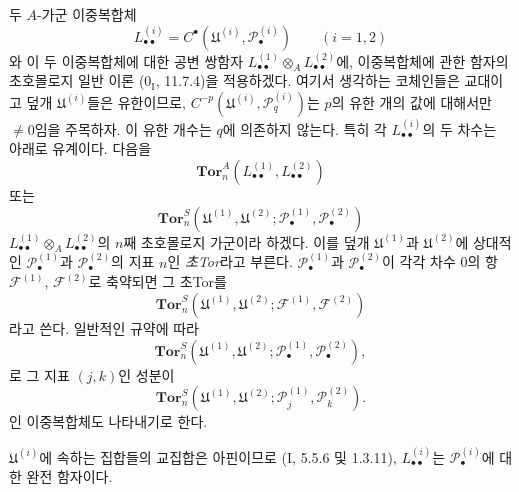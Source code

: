 \begin{env}[6.6.2]
\label{III.6.6.2-fr}
두 $A$-가군 이중복합체
\[
  L_{\bullet\bullet}^{(i)}
  =C^\bullet(\mathfrak U^{(i)},\mathscr P_\bullet^{(i)})
  \qquad(i=1,2)
\]
와 이 두 이중복합체에 대한 공변 쌍함자
$L_{\bullet\bullet}^{(1)}\otimes_A L_{\bullet\bullet}^{(2)}$에,
이중복합체에 관한 함자의 초호몰로지 일반 이론
($0_{\mathrm I}$, 11.7.4)을 적용하겠다. 여기서 생각하는 코체인들은
교대이고 덮개 $\mathfrak U^{(i)}$들은 유한이므로,
$C^{-p}(\mathfrak U^{(i)},\mathscr P_q^{(i)})$는 $p$의 유한 개의
값에 대해서만 $\ne0$임을 주목하자. 이 유한 개수는 $q$에 의존하지
않는다. 특히 각 $L_{\bullet\bullet}^{(i)}$의 두 차수는 아래로
유계이다. 다음을
\[
  \mathbf{Tor}_n^A(L_{\bullet\bullet}^{(1)},L_{\bullet\bullet}^{(2)})
\]
또는
\[
  \mathbf{Tor}_n^S
  (\mathfrak U^{(1)},\mathfrak U^{(2)};
   \mathscr P_\bullet^{(1)},\mathscr P_\bullet^{(2)})
\]
$L_{\bullet\bullet}^{(1)}\otimes_A L_{\bullet\bullet}^{(2)}$의 $n$째
초호몰로지 가군이라 하겠다. 이를 덮개 $\mathfrak U^{(1)}$과
$\mathfrak U^{(2)}$에 상대적인 $\mathscr P_\bullet^{(1)}$과
$\mathscr P_\bullet^{(2)}$의 지표 $n$인 \emph{초Tor}라고 부른다.
$\mathscr P_\bullet^{(1)}$과 $\mathscr P_\bullet^{(2)}$이 각각 차수
0의 항 $\mathscr F^{(1)}$, $\mathscr F^{(2)}$로 축약되면 그
초Tor를
\[
  \mathbf{Tor}_n^S
  (\mathfrak U^{(1)},\mathfrak U^{(2)};
   \mathscr F^{(1)},\mathscr F^{(2)})
\]
라고 쓴다. 일반적인 규약에 따라
\[
  \mathbf{Tor}_n^S
  (\mathfrak U^{(1)},\mathfrak U^{(2)};
   \mathscr P_\bullet^{(1)},\mathscr P_\bullet^{(2)}),
\]
로 그 지표 $(j,k)$인 성분이
\[
  \mathbf{Tor}_n^S
  (\mathfrak U^{(1)},\mathfrak U^{(2)};
   \mathscr P_j^{(1)},\mathscr P_k^{(2)}).
\]
인 이중복합체도 나타내기로 한다.

$\mathfrak U^{(i)}$에 속하는 집합들의 교집합은 아핀이므로
(I, 5.5.6 및 1.3.11), $L_{\bullet\bullet}^{(i)}$는
$\mathscr P_\bullet^{(i)}$에 대한 완전 함자이다.



\end{env}
